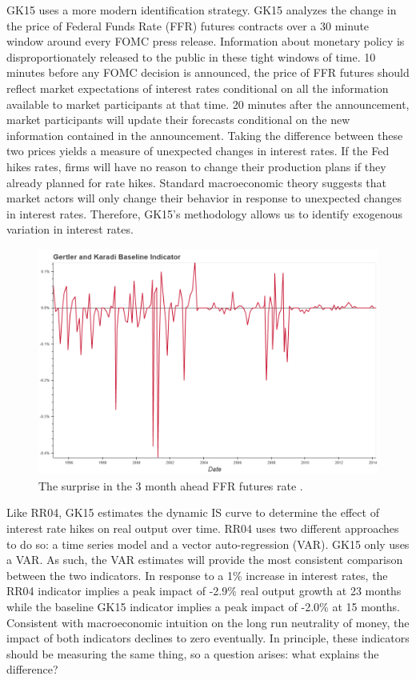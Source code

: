\documentclass[a4paper,man,floatsintext,natbib]{apa6}
\begin{document}
	GK15 uses a more modern identification strategy. GK15 analyzes the change in the price of Federal Funds Rate (FFR) futures contracts over a 30 minute window around every FOMC press release. Information about monetary policy is disproportionately released to the public in these tight windows of time. 10 minutes before any FOMC decision is announced, the price of FFR futures should reflect market expectations of interest rates conditional on all the information available to market participants at that time. 20 minutes after the announcement, market participants will update their forecasts conditional on the new information contained in the announcement. Taking the difference between these two prices yields a measure of unexpected changes in interest rates. If the Fed hikes rates, firms will have no reason to change their production plans if they already planned for rate hikes. Standard macroeconomic theory suggests that market actors will only change their behavior in response to unexpected changes in interest rates. Therefore, GK15's methodology allows us to identify exogenous variation in interest rates.
	\begin{figure}
		\centering
		\includegraphics[width=\textwidth]{charts/gk15.png}
		\caption{\label{gk15} The surprise in the 3 month ahead FFR futures rate \citep{Gertler2015}.}
	\end{figure}
	
	Like RR04, GK15 estimates the dynamic IS curve to determine the effect of interest rate hikes on real output over time. RR04 uses two different approaches to do so: a time series model and a vector auto-regression (VAR). GK15 only uses a VAR. As such, the VAR estimates will provide the most consistent comparison between the two indicators. In response to a 1\% increase in interest rates, the RR04 indicator implies a peak impact of -2.9\% real output growth at 23 months while the baseline GK15 indicator implies a peak impact of -2.0\% at 15 months. Consistent with macroeconomic intuition on the long run neutrality of money, the impact of both indicators declines to zero eventually. In principle, these indicators should be measuring the same thing, so a question arises: what explains the difference?  
	
\end{document}
